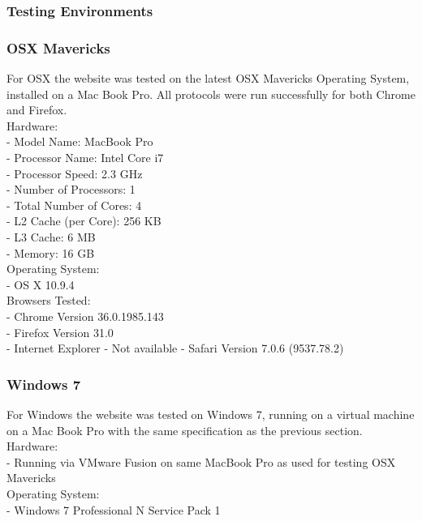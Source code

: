 \documentclass[a4paper,11pt,titlepage]{article}
\begin{document}
\subsubsection{Testing Environments}


\subsubsection*{OSX Mavericks}

For OSX the website was tested on the latest OSX Mavericks Operating System, installed on a Mac Book Pro. All protocols were run successfully for both Chrome and Firefox.\\

\noindent Hardware:\\
- Model Name:	MacBook Pro\\
- Processor Name:	Intel Core i7\\
- Processor Speed:	2.3 GHz\\
- Number of Processors:	1\\
- Total Number of Cores:	4\\
- L2 Cache (per Core):	256 KB\\
- L3 Cache:	6 MB\\
- Memory:	16 GB\\


\noindent Operating System:\\
- OS X 10.9.4\\

\noindent Browsers Tested:\\
- Chrome Version 36.0.1985.143\\
- Firefox Version 31.0\\
- Internet Explorer - Not available
- Safari Version 7.0.6 (9537.78.2)\\

\subsubsection*{Windows 7}

For Windows the website was tested on Windows 7, running on a virtual machine on a Mac Book Pro with the same specification as the previous section.\\

\noindent Hardware:\\
- Running via VMware Fusion on same MacBook Pro as used for testing OSX Mavericks\\

\noindent Operating System:\\
- Windows 7 Professional N Service Pack 1\\
\end{document}
